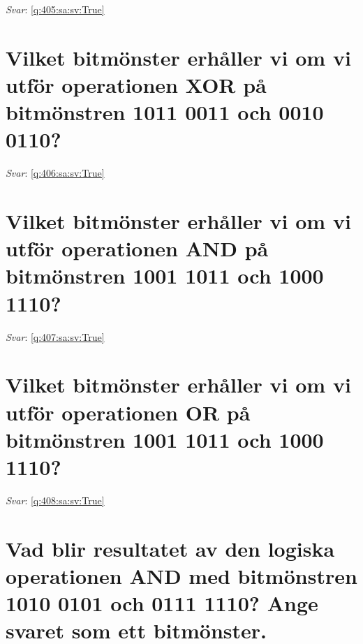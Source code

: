 \documentclass[a4paper,11pt,oneside]{book}
\begin{document}
\begin{sloppypar}
\textit{Svar}: \autoref{q:405:sa:sv:True}



\section{Vilket bitm\"onster erh\r{a}ller vi om vi utf\"or operationen XOR p\r{a} bitm\"onstren 1011 0011 och 0010 0110?}

\label{q:406:sa:sv:False}

\vspace{2cm}

\noindent\makebox[\textwidth]{\hrulefill}

\vspace{1cm}

\textit{Svar}: \autoref{q:406:sa:sv:True}



\section{Vilket bitm\"onster erh\r{a}ller vi om vi utf\"or operationen AND p\r{a} bitm\"onstren 1001 1011 och 1000 1110?}

\label{q:407:sa:sv:False}

\vspace{2cm}

\noindent\makebox[\textwidth]{\hrulefill}

\vspace{1cm}

\textit{Svar}: \autoref{q:407:sa:sv:True}



\section{Vilket bitm\"onster erh\r{a}ller vi om vi utf\"or operationen OR p\r{a} bitm\"onstren 1001 1011 och 1000 1110?}

\label{q:408:sa:sv:False}

\vspace{2cm}

\noindent\makebox[\textwidth]{\hrulefill}

\vspace{1cm}

\textit{Svar}: \autoref{q:408:sa:sv:True}



\section{Vad blir resultatet av den logiska operationen AND med bitm\"onstren 1010 0101 och 0111 1110? Ange svaret som ett bitm\"onster.}


\end{sloppypar}
\end{document}
